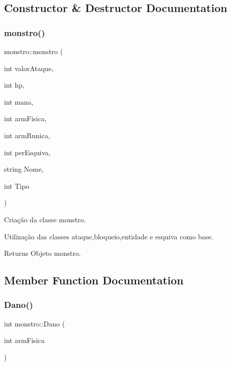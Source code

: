 \subsection{Constructor \& Destructor Documentation}
\mbox{\label{classmonstro_a0c7be686f5717cb625a3dabb75f6143f}} 
\subsubsection{\texorpdfstring{monstro()}{monstro()}}
{\footnotesize\ttfamily monstro\+::monstro (\begin{DoxyParamCaption}\item[{int}]{valor\+Ataque,  }\item[{int}]{hp,  }\item[{int}]{mana,  }\item[{int}]{arm\+Fisica,  }\item[{int}]{arm\+Runica,  }\item[{int}]{per\+Esquiva,  }\item[{string}]{Nome,  }\item[{int}]{Tipo }\end{DoxyParamCaption})}



Criação da classe monstro. 

Utilização das classes ataque,bloqueio,entidade e esquiva como base. \begin{DoxyReturn}{Returns}
Objeto monstro. 
\end{DoxyReturn}


\subsection{Member Function Documentation}
\mbox{\label{classmonstro_ad13bd91217c356e1e4ef3e50ee4160aa}} 
\subsubsection{\texorpdfstring{Dano()}{Dano()}}
{\footnotesize\ttfamily int monstro\+::\+Dano (\begin{DoxyParamCaption}\item[{int}]{arm\+Fisica }\end{DoxyParamCaption})}



